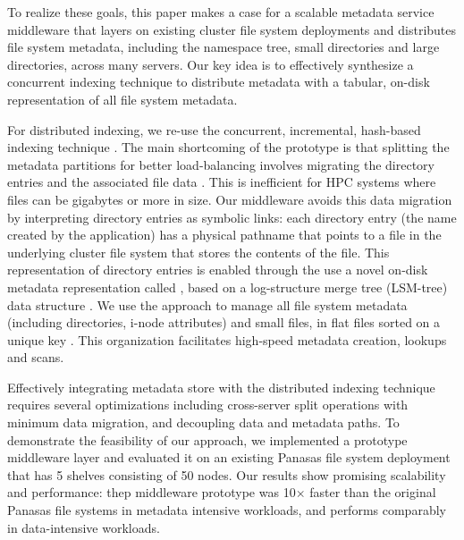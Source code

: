 To realize these goals, this paper makes a case for a scalable metadata service
middleware that layers on existing cluster file system deployments and
distributes file system metadata, including the namespace tree, small
directories and large directories, across many servers.
Our key idea is to effectively synthesize a concurrent indexing
technique to distribute metadata with a tabular, on-disk representation of all
file system metadata.

For distributed indexing, we re-use the concurrent, incremental, hash-based
\giga{} indexing technique \cite{GIGA11}.
The main shortcoming of the \giga{} prototype is that splitting
the metadata partitions for better load-balancing involves migrating the
directory entries and the associated file data \cite{GIGA11}.
This is inefficient for HPC systems where files can be gigabytes or more in
size. Our middleware avoids this data migration by interpreting directory
entries as symbolic links: each directory entry (the name created by the
application) has a physical pathname that points to a file in the underlying
cluster file system that stores the contents of the file.
This representation of directory entries is enabled through the use a novel
on-disk metadata representation called \tfs \cite{TableFS},
based on a log-structure merge tree (LSM-tree) data structure \cite{ONeil1996}.
We use the \tfs approach to manage all file system metadata
(including directories, i-node attributes) and small files,
in flat files sorted on a unique key \cite{LevelDB}.
This organization facilitates high-speed metadata creation, lookups and scans.

Effectively integrating \tfs metadata store with the distributed indexing
technique requires several optimizations including cross-server split operations
with minimum data migration, and decoupling data and metadata paths.
To demonstrate the feasibility of our approach,
we implemented a prototype middleware layer and evaluated it
on an existing Panasas file system deployment \cite{PanFS} that has 5 shelves consisting of 50 nodes.
Our results show promising scalability and performance:
thep middleware prototype was 10$\times$ faster than the original Panasas file systems 
in metadata intensive workloads, and performs comparably in data-intensive workloads.


